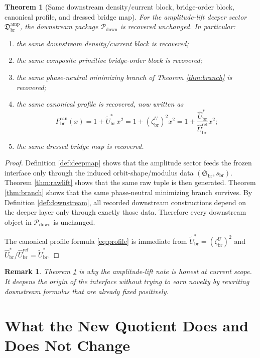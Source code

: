 \documentclass[11pt]{article}
\newcommand{\RespShapeEq}{\widetilde U_{\mathrm{br}}^{\ast}}
\newcommand{\RespRawRef}{\widehat U_{\mathrm{br}}^{\mathrm{ref}}}
\newcommand{\RespRawEq}{\widehat U_{\mathrm{br}}^{\ast}}
\newcommand{\CurvProfileCan}{F_{\mathrm{br}}^{\mathrm{can}}}
\newcommand{\DownPkg}{\mathscr P_{\mathrm{down}}}
\newcommand{\ShapeTuple}{\mathfrak S_{\mathrm{br}}}
\newcommand{\ScaleMod}{s_{\mathrm{br}}}
\newcommand{\DeepSector}{\mathfrak D_{\mathrm{br}}^{\mathrm{amp}}}
\newcommand{\DeepEqAmp}{\zeta_{\mathrm{br}}^{U}}
\newtheorem{remark}{Remark}
\newtheorem{theorem}{Theorem}
\begin{document}
\begin{theorem}[Same downstream density/current block, bridge-order block, canonical profile, and dressed bridge map]
\label{thm:down}
For the amplitude-lift deeper sector \(\DeepSector\), the downstream package \(\DownPkg\) is recovered unchanged. In particular:
\begin{enumerate}
    \item the same downstream density/current block is recovered;
    \item the same composite primitive bridge-order block is recovered;
    \item the same phase-neutral minimizing branch of Theorem \ref{thm:branch} is recovered;
    \item the same canonical profile is recovered, now written as
    \begin{equation}
    \CurvProfileCan(x)
    =
    1+\RespShapeEq\,x^{2}
    =
    1+(\DeepEqAmp)^{2}x^{2}
    =
    1+\frac{\RespRawEq}{\RespRawRef}x^{2};
    \label{eq:profile}
    \end{equation}
    \item the same dressed bridge map is recovered.
\end{enumerate}
\end{theorem}

\begin{proof}
Definition \ref{def:deepmap} shows that the amplitude sector feeds the frozen interface only through the induced orbit-shape/modulus data \((\ShapeTuple,\ScaleMod)\). Theorem \ref{thm:rawlift} shows that the same raw tuple is then generated. Theorem \ref{thm:branch} shows that the same phase-neutral minimizing branch survives. By Definition \ref{def:downstream}, all recorded downstream constructions depend on the deeper layer only through exactly those data. Therefore every downstream object in \(\DownPkg\) is unchanged.

The canonical profile formula \eqref{eq:profile} is immediate from \(\RespShapeEq=(\DeepEqAmp)^{2}\) and \(\RespRawEq/\RespRawRef=\RespShapeEq\).
\end{proof}

\begin{remark}
Theorem \ref{thm:down} is why the amplitude-lift note is honest at current scope. It deepens the origin of the interface without trying to earn novelty by rewriting downstream formulas that are already fixed positively.
\end{remark}

\section{What the New Quotient Does and Does Not Change}
\end{document}
